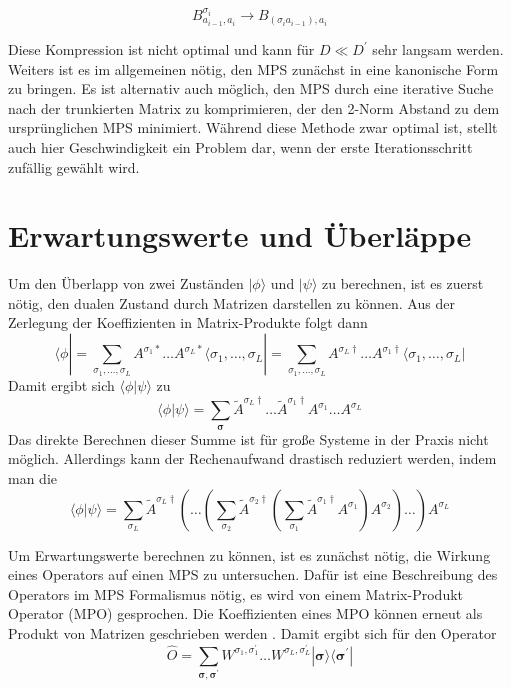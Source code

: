 \documentclass[10pt,a4paper]{report}
\newcommand{\SumIndex}{\sigma_1,\ldots,\sigma_L}
\begin{document}
\begin{equation}
B_{a_{i-1},a_{i}}^{\sigma_i}\rightarrow B_{(\sigma_i a_{i-1}),a_i}
\end{equation}

Diese Kompression ist nicht optimal und kann für $D\ll D^\prime$ sehr langsam werden. Weiters ist es im allgemeinen nötig, den MPS zunächst in eine kanonische Form zu bringen. Es ist alternativ auch möglich, den MPS durch eine iterative Suche nach der trunkierten Matrix zu komprimieren, der den 2-Norm Abstand zu dem ursprünglichen MPS minimiert. Während diese Methode zwar optimal ist, stellt auch hier Geschwindigkeit ein Problem dar, wenn der erste Iterationsschritt zufällig gewählt wird.

\section{Erwartungswerte und Überläppe}\label{MPO}
Um den Überlapp von zwei Zuständen $|\phi\rangle$ und $|\psi\rangle$ zu berechnen, ist es zuerst nötig, den dualen Zustand durch Matrizen darstellen zu können. Aus der Zerlegung der Koeffizienten in Matrix-Produkte folgt dann
\begin{equation}
\langle\phi|=\sum_{\SumIndex} A^{\sigma_1\ast}\ldots A^{\sigma_L \ast}\langle\SumIndex| = \sum_{\SumIndex}A^{\sigma_L\dagger}\ldots A^{\sigma_1 \dagger}\langle\SumIndex|
\end{equation}
Damit ergibt sich $\langle\phi|\psi\rangle$ zu 
\begin{equation}
\langle\phi|\psi\rangle=\sum_{\bm{\sigma}}\tilde{A}^{\sigma_L \dagger}\ldots\tilde{A}^{\sigma_1 \dagger} A^{\sigma_1}\ldots A^{\sigma_L} 
\end{equation}
Das direkte Berechnen dieser Summe ist für große Systeme in der Praxis nicht möglich. Allerdings kann der Rechenaufwand drastisch reduziert werden, indem man die 
\begin{equation}
\langle\phi|\psi\rangle=\sum_{\sigma_L}\tilde{A}^{\sigma_L\dagger}(\ldots(\sum_{\sigma_2}\tilde{A}^{\sigma_2\dagger}(\sum_{\sigma_1}\tilde{A}^{\sigma_1\dagger}A^{\sigma_1})A^{\sigma_2})\ldots)A^{\sigma_L}
\end{equation}

Um Erwartungswerte berechnen zu können, ist es zunächst nötig, die Wirkung eines Operators auf einen MPS zu untersuchen. Dafür ist eine Beschreibung des Operators im MPS Formalismus nötig, es wird von einem Matrix-Produkt Operator (MPO) gesprochen. Die Koeffizienten eines MPO können erneut als Produkt von Matrizen geschrieben werden . Damit ergibt sich für den Operator
\begin{equation}
\hat{O}=\sum_{\bm{\sigma},\bm{\sigma^\prime}}W^{\sigma_1,\sigma_1^\prime}\ldots W^{\sigma_L,\sigma_L^\prime} |\bm{\sigma}\rangle\langle\bm{\sigma^\prime}|
\end{equation}
\end{document}
